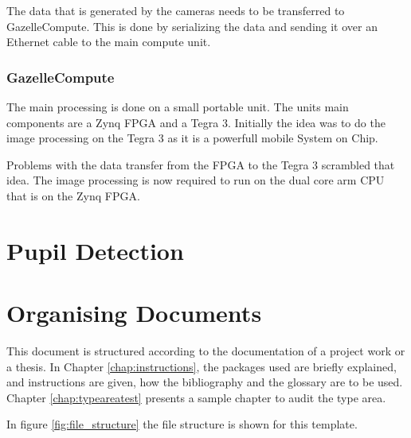 The data that is generated by the cameras needs to be transferred to GazelleCompute. This is done by serializing the data and sending it over an Ethernet cable to the main compute unit.
\subsubsection{GazelleCompute}
The main processing is done on a small portable unit. The units main components are a Zynq FPGA and a Tegra 3. Initially the idea was to do the image processing on the Tegra 3 as it is a powerfull mobile System on Chip.

Problems with the data transfer from the FPGA to the Tegra 3 scrambled that idea. The image processing is now required to run on the dual core arm CPU that is on the Zynq FPGA.
\section{Pupil Detection}

\section{Organising Documents}
\label{sec:einleitung_aufbau}

This document is structured according to the documentation of a project work or a thesis. In Chapter \ref{chap:instructions}, the packages used are briefly explained, and instructions are given, how the bibliography and the glossary are to be used. Chapter \ref{chap:typeareatest} presents a sample chapter to audit the type area.

In figure \ref{fig:file_structure} the file structure is shown for this template.

